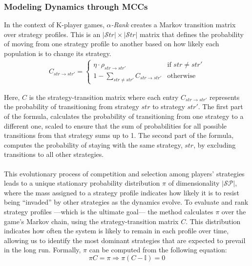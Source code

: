 \begin{flushleft}
\begin{flushleft}
    \end{flushleft}

    \subsubsection{Modeling Dynamics through MCCs}
    
    \begin{flushleft}

        In the context of K-player games, \emph{$\alpha$-Rank} creates a Markov transition matrix over strategy profiles. This is an $|\mathcal{S}tr| \times |\mathcal{S}tr|$ matrix that defines the probability of moving from one strategy profile to another based on how likely each population is to change its strategy.
        \begin{eqnarray}
            C_{str \to str'} = 
            \begin{cases} 
                \eta \cdot \rho_{str \to str'} & \text{if } str \neq str' \\ 
                1 - \sum_{str \neq str'} C_{str \to str'} & \text{otherwise}
            \end{cases} 
            \label{eq:transition_matrix_entry}
        \end{eqnarray}

        Here, $C$ is the strategy-transition matrix where each entry $C_{str \to str'}$ represents the probability of transitioning from strategy $str$ to strategy $str'$. The first part of the formula, calculates the probability of transitioning from one strategy to a different one, scaled to ensure that the sum of probabilities for all possible transitions from that strategy sums up to 1. The second part of the formula, computes the probability of staying with the same strategy, $str$, by excluding transitions to all other strategies.\\~\\

        This evolutionary process of competition and selection among players' strategies leads to a unique stationary probability distribution $\pi$ of dimensionality $|\mathcal{SP}|$, where the mass assigned to a strategy profile indicates how likely it is to resist being ``invaded'' by other strategies as the dynamics evolve. To evaluate and rank strategy profiles —which is the ultimate goal— the method calculates $\pi$ over the game's Markov chain, using the strategy-transition matrix $C$. This distribution indicates how often the system is likely to remain in each profile over time, allowing us to identify the most dominant strategies that are expected to prevail in the long run. Formally, $\pi$ can be computed from the following equation:
        \begin{equation}
            \pi C = \pi \Rightarrow \pi (C - \mathbb{I}) = 0 
            \label{eq:stationary_distribution}
        \end{equation}


\end{flushleft}
\end{flushleft}
